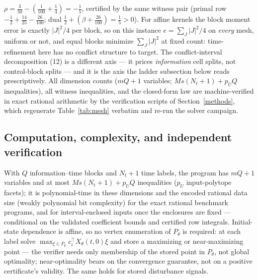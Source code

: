 \documentclass[10pt,twocolumn]{article}
\theoremstyle{plain}
\theoremstyle{definition}
\theoremstyle{remark}
\begin{document}
\(\rho = \tfrac3{50} - (\tfrac1{100} + \tfrac14) = -\tfrac15\),
certified by the same witness pair (primal row
\(-\tfrac12 + \tfrac{14}{25} - \tfrac{26}{100}\); dual
\(\tfrac12 + (\beta + \tfrac{26}{100}) = \tfrac15 > 0\)). For affine
kernels the block moment error is exactly \(|J|^2/4\) per block, so on
this instance \(e = \sum_J |J|^2/4\) on \emph{every} mesh, uniform or
not, and equal blocks minimize \(\sum_J |J|^2\) at fixed count:
time-refinement here has no conflict structure to target. The
conflict-interval decomposition (12) is a different axis --- it prices
\emph{information} cell splits, not control-block splits --- and it is
the axis the ladder subsection below reads prescriptively. All dimension counts
(\(mQ + 1\) variables; \(Ms(N_t{+}1) + p_U Q\) inequalities), all witness
inequalities, and the closed-form law are machine-verified in exact rational
arithmetic by the verification scripts of Section~\ref{methods}, which
regenerate Table~\ref{tab:mesh} verbatim and re-run the solver campaign.

\subsection{Computation, complexity, and independent verification}\label{computation}

With \(Q\) information--time blocks and \(N_t + 1\) time labels, the program
has \(mQ + 1\) variables and at most \(Ms(N_t{+}1) + p_U Q\) inequalities
(\(p_U\) input-polytope facets); it is polynomial-time in these dimensions and the encoded rational data
size (weakly polynomial bit complexity) for the exact rational benchmark
programs, and for interval-enclosed inputs once the enclosures are fixed ---
conditional on the validated coefficient bounds and certified row
integrals.
Initial-state dependence is affine, so no vertex enumeration of \(P_\theta\)
is required: at each label solve
\(\max_{\xi \in P_\theta} c_i^\top X_\theta(t,0)\xi\) and store a maximizing
or near-maximizing point --- the verifier needs only membership of the stored
point in \(P_\theta\), not global optimality; near-optimality bears on the
convergence guarantee, not on a positive certificate's validity. The same
holds for stored disturbance signals.
\end{document}
